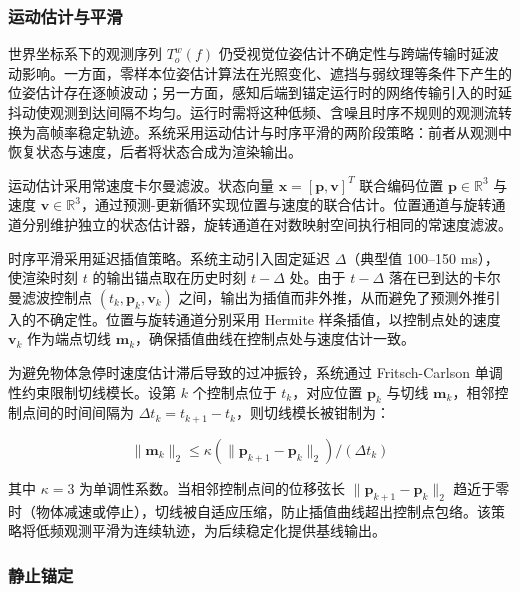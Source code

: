 \documentclass[review]{vgtc}
\begin{document}
\subsubsection{运动估计与平滑}\label{sec:smoothing}


世界坐标系下的观测序列 ${T_o^w (f)}$ 仍受视觉位姿估计不确定性与跨端传输时延波动影响。一方面，零样本位姿估计算法在光照变化、遮挡与弱纹理等条件下产生的位姿估计存在逐帧波动；另一方面，感知后端到锚定运行时的网络传输引入的时延抖动使观测到达间隔不均匀。运行时需将这种低频、含噪且时序不规则的观测流转换为高帧率稳定轨迹。系统采用运动估计与时序平滑的两阶段策略：前者从观测中恢复状态与速度，后者将状态合成为渲染输出。

运动估计采用常速度卡尔曼滤波。状态向量 $\mathbf{x} = [\mathbf{p}, \mathbf{v}]^T$ 联合编码位置 $\mathbf{p} \in \mathbb{R}^3$ 与速度 $\mathbf{v} \in \mathbb{R}^3$，通过预测-更新循环实现位置与速度的联合估计。位置通道与旋转通道分别维护独立的状态估计器，旋转通道在对数映射空间执行相同的常速度滤波。

时序平滑采用延迟插值策略。系统主动引入固定延迟 $\Delta$（典型值 100--150 ms），使渲染时刻 $t$ 的输出锚点取在历史时刻 $t - \Delta$ 处。由于 $t - \Delta$ 落在已到达的卡尔曼滤波控制点 ${(t_k, \mathbf{p}_k, \mathbf{v}_k)}$ 之间，输出为插值而非外推，从而避免了预测外推引入的不确定性。位置与旋转通道分别采用 Hermite 样条插值，以控制点处的速度 $\mathbf{v}_k$ 作为端点切线 $\mathbf{m}_k$，确保插值曲线在控制点处与速度估计一致。

为避免物体急停时速度估计滞后导致的过冲振铃，系统通过 Fritsch-Carlson 单调性约束限制切线模长。设第 $k$ 个控制点位于 $t_k$，对应位置 $\mathbf{p}_k$ 与切线 $\mathbf{m}_k$，相邻控制点间的时间间隔为 $\Delta t_k = t_{k+1} - t_k$，则切线模长被钳制为：

\begin{equation}
\lVert \mathbf{m}_k \rVert_2 \leq \kappa (\lVert \mathbf{p}_{k+1} - \mathbf{p}_k \rVert_2) / (\Delta t_k)
\label{eq:tangent-clamp}
\end{equation}


其中 $\kappa = 3$ 为单调性系数。当相邻控制点间的位移弦长 $\lVert \mathbf{p}_{k+1} - \mathbf{p}_k \rVert_2$ 趋近于零时（物体减速或停止），切线被自适应压缩，防止插值曲线超出控制点包络。该策略将低频观测平滑为连续轨迹，为后续稳定化提供基线输出。

\subsubsection{静止锚定}\label{sec:staticlock}
\end{document}
